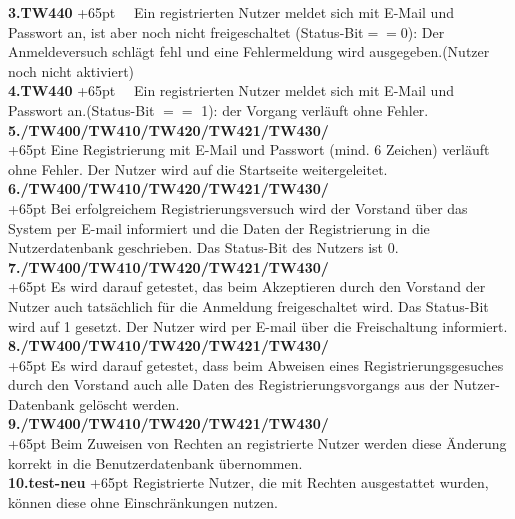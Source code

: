 \documentclass[fontsize = 12pt, paper = a4]{scrreprt}
\begin{document}
\textbf{3.TW440}
\hangindent+65pt 
\ \ Ein registrierten Nutzer meldet sich mit E-Mail und Passwort an, ist aber noch nicht freigeschaltet (Status-Bit$==$0): Der Anmeldeversuch schlägt fehl und eine Fehlermeldung wird ausgegeben.(Nutzer noch nicht aktiviert)\\
 
\textbf{4.TW440}
\hangindent+65pt 
\ \ Ein registrierten Nutzer meldet sich mit E-Mail und Passwort an.(Status-Bit $==$ 1): der Vorgang verläuft ohne Fehler.\\
 
\textbf{5./TW400/TW410/TW420/TW421/TW430/}\\
\hangindent+65pt 
Eine Registrierung mit E-Mail und Passwort (mind. 6 Zeichen) verläuft ohne Fehler. Der Nutzer wird auf die Startseite weitergeleitet.\\

\textbf{6./TW400/TW410/TW420/TW421/TW430/}\\
\hangindent+65pt 
Bei erfolgreichem Registrierungsversuch wird der Vorstand über das System per E-mail  informiert und die Daten der Registrierung in die Nutzerdatenbank geschrieben. Das Status-Bit des Nutzers ist 0.\\

\textbf{7./TW400/TW410/TW420/TW421/TW430/}\\
\hangindent+65pt 
Es wird darauf getestet, das beim Akzeptieren durch den Vorstand der Nutzer auch tatsächlich für die Anmeldung freigeschaltet wird. Das Status-Bit wird auf 1 gesetzt. Der Nutzer wird per E-mail über die Freischaltung informiert. \\


\textbf{8./TW400/TW410/TW420/TW421/TW430/}\\
\hangindent+65pt 
Es wird darauf getestet, dass beim Abweisen eines Registrierungsgesuches durch den Vorstand auch alle Daten des Registrierungsvorgangs aus der Nutzer-Datenbank gelöscht werden. \\

\textbf{9./TW400/TW410/TW420/TW421/TW430/}\\
\hangindent+65pt 
Beim Zuweisen von Rechten an registrierte Nutzer werden diese Änderung korrekt in die Benutzerdatenbank übernommen.\\

\textbf{10.test-neu}
\hangindent+65pt 
Registrierte Nutzer, die mit Rechten ausgestattet wurden, können diese ohne Einschränkungen nutzen.
\end{document}
